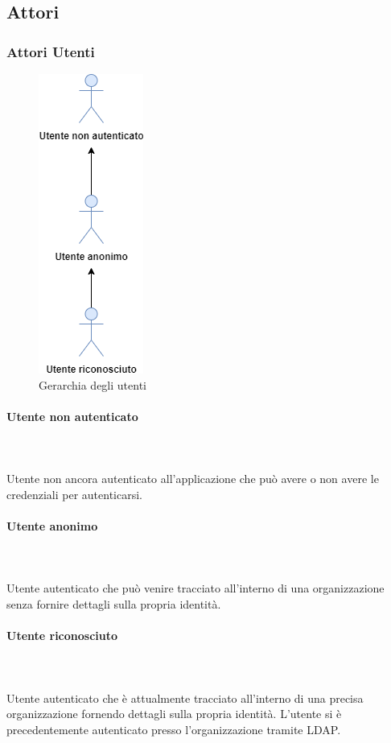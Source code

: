 \subsection{Attori}
\subsubsection{Attori Utenti}

\begin{figure}[h]
  \caption{Gerarchia degli utenti}
  \centering
    \includegraphics[scale=0.6]{Sezioni/UseCase/Immagini/Utenti.png}
\end{figure}

\paragraph{Utente non autenticato}\mbox{}\\ \\
Utente non ancora autenticato all'applicazione che può avere o non avere le credenziali per autenticarsi.
\paragraph{Utente anonimo}\mbox{}\\ \\
Utente autenticato che può venire tracciato all'interno di una organizzazione senza fornire dettagli sulla propria identità.
\paragraph{Utente riconosciuto}\mbox{}\\ \\
Utente autenticato che è attualmente tracciato all'interno di una precisa organizzazione fornendo dettagli sulla propria identità.
L'utente si è precedentemente autenticato presso l'organizzazione tramite LDAP.



